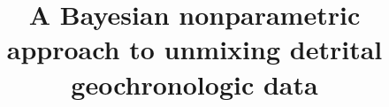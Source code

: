 %
%
%
%
%
%
\RequirePackage{fix-cm}
%
\documentclass[smallextended]{svjour3}       %
%
\smartqed  %
%
\usepackage{graphicx}
%
%
\usepackage{url}
\usepackage{hyperref}
\usepackage{amsmath}
\usepackage{float}
\usepackage{subcaption}
\captionsetup{compatibility=false}
\usepackage{setspace}
\usepackage{lineno}
\usepackage{textcomp}
\usepackage{gensymb}
%
\usepackage{xcolor} %
%
\usepackage{natbib} %
%
\newcommand\numberthis{\addtocounter{equation}{1}\tag{\theequation}}
%
%
%


\title{A Bayesian nonparametric approach to unmixing detrital geochronologic data%
}
\subtitle{}


